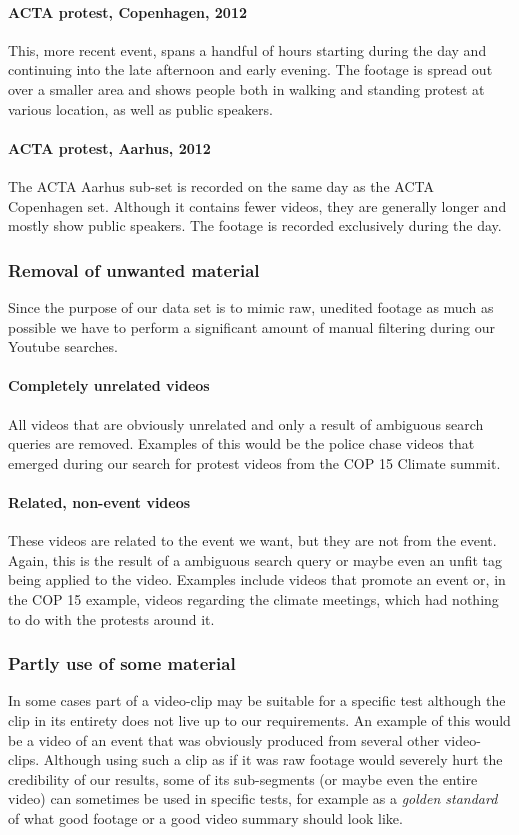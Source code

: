 \paragraph{ACTA protest, Copenhagen, 2012}
%
This, more recent event, spans a handful of hours starting during the day and continuing into the late afternoon and early evening. The footage is spread out over a smaller area and shows people both in walking and standing protest at various location, as well as public speakers.
%
\paragraph{ACTA protest, Aarhus, 2012}
%
The ACTA Aarhus sub-set is recorded on the same day as the ACTA Copenhagen set. Although it contains fewer videos, they are generally longer and mostly show public speakers. The footage is recorded exclusively during the day.
%
\subsubsection{Removal of unwanted material}
%
Since the purpose of our data set is to mimic raw, unedited footage as much as possible we have to perform a significant amount of manual filtering during our Youtube searches.\\
%
\paragraph{Completely unrelated videos}
%
All videos that are obviously unrelated and only a result of ambiguous search queries are removed. Examples of this would be the police chase videos that emerged during our search for protest videos from the COP 15 Climate summit.
%
\paragraph{Related, non-event videos}
%
These videos are related to the event we want, but they are not from the event. Again, this is the result of a ambiguous search query or maybe even an unfit tag being applied to the video. Examples include videos that promote an event or, in the COP 15 example, videos regarding the climate meetings, which had nothing to do with the protests around it.
%
\subsubsection{Partly use of some material}
%
In some cases part of a video-clip may be suitable for a specific test although the clip in its entirety does not live up to our requirements. An example of this would be a video of an event that was obviously produced from several other video-clips. Although using such a clip as if it was raw footage would severely hurt the credibility of our results, some of its sub-segments (or maybe even the entire video) can sometimes be used in specific tests, for example as a \textit{golden standard} of what good footage or a good video summary should look like.
%
